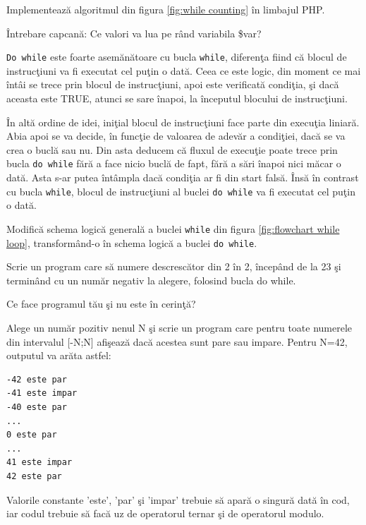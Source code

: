 \begin{Exercise}[title={Numărătoarea din 1 în 1 cu while},difficulty=1]
\ExePart
Implementează algoritmul din figura \ref{fig:while counting} în limbajul PHP.

\ExePart
Întrebare capcană: Ce valori va lua pe rând variabila \$var?
\end{Exercise}

\texttt{Do while} este foarte asemănătoare cu bucla \texttt{while},
diferenţa fiind că blocul de instrucţiuni va fi executat cel
puţin o dată. Ceea ce este logic, din moment ce mai întâi se
trece prin blocul de instrucţiuni, apoi este verificată condiţia, şi
dacă aceasta este TRUE, atunci se sare înapoi, la începutul blocului de
instrucţiuni.

În altă ordine de idei, iniţial blocul de instrucţiuni
face parte din execuţia liniară. Abia apoi se va decide, în funcţie de valoarea
de adevăr a condiţiei, dacă se va crea o buclă sau nu. Din asta deducem
că fluxul de execuţie poate trece prin {\glqq}bucla{\grqq} \texttt{do while} fără
a face nicio buclă de fapt, fără a sări înapoi nici măcar o dată. Asta s-ar putea
întâmpla dacă condiţia ar fi din start falsă. Însă în contrast cu bucla
\texttt{while}, blocul de instrucţiuni al buclei \texttt{do while} va fi executat cel
puţin o dată.

\begin{Exercise}[title={Schema logică a buclei do while},difficulty=1]
Modifică schema logică generală a buclei \texttt{while} din
figura \ref{fig:flowchart while loop}, transformând-o în
schema logică a buclei \texttt{do while}.
\end{Exercise}


\begin{Exercise}[title={Numărătoarea din doi în doi cu do while},difficulty=1]
\ExePart
Scrie un program care să numere descrescător din 2 în 2, începând de la 23
şi terminând cu un număr negativ la alegere, folosind bucla do while.

\ExePart
Ce face programul tău şi nu este în cerinţă?
\end{Exercise}

\begin{Exercise}[title={Par sau impar?},difficulty=2]
Alege un număr pozitiv nenul N şi scrie un program care
pentru toate numerele din intervalul [-N;N] afişează dacă acestea sunt pare
sau impare. Pentru N=42, outputul va arăta astfel:
\begin{verbatim}
-42 este par
-41 este impar
-40 este par
...
0 este par
...
41 este impar
42 este par
\end{verbatim}
Valorile constante 'este', 'par' şi 'impar' trebuie să apară o singură dată în
cod, iar codul trebuie să facă uz de operatorul ternar şi de operatorul modulo.
\end{Exercise}

